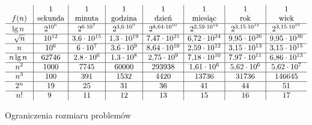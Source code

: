 \begin{table}[h]
	\begin{scriptsize}
		\[
			\begin{array}{c|c|c|c|c|c|c|c}
				&1&1&1&1&1&1&1 \\
				f(n) & \hbox{sekunda} & \hbox{minuta} & \hbox{godzina} & \hbox{dzień} & \hbox{miesiąc} & \hbox{rok} & \hbox{wiek} \\
				\hline
				\lg n~& 2^{10^6} & 2^{6\cdot 10^7} & 2^{3{,}6\cdot 10^9} & 2^{8{,}64\cdot 10^{10}} & 2^{2{,}59\cdot 10^{12}} & 2^{3{,}15\cdot 10^{13}} & 2^{3{,}15\cdot 10^{15}} \\
				\hline
				\sqrt{n} & 10^{12} & 3{,}6\cdot 10^{15} & 1{,}3\cdot 10^{19} & 7{,}47\cdot 10^{21} & 6{,}72\cdot 10^{24} & 9{,}95\cdot 10^{26} & 9{,}95\cdot 10^{30} \\
				\hline
				n & 10^6 & 6\cdot 10^7 & 3{,}6\cdot 10^9 & 8{,}64\cdot 10^{10} & 2{,}59\cdot 10^{12} & 3{,}15\cdot 10^{13} & 3{,}15\cdot 10^{15} \\
				\hline
				n\lg n~& 62746 & 2{,}8\cdot 10^6 & 1{,}3\cdot 10^8 & 2{,}75\cdot 10^9 & 7{,}18\cdot 10^{10} & 7{,}97\cdot 10^{11} & 6{,}86\cdot 10^{13} \\
				\hline
				n^2 & 1000 & 7745 & 60000 & 293938 & 1{,}61\cdot 10^6 & 5{,}62\cdot 10^6 & 5{,}62\cdot 10^7 \\
				\hline
				n^3 & 100 & 391 & 1532 & 4420 & 13736 & 31736 & 146645 \\
				\hline
				2^n & 19 & 25 & 31 & 36 & 41 & 44 & 51 \\
				\hline
				n! & 9~& 11 & 12 & 13 & 15 & 16 & 17
			\end{array}
		\]
	\end{scriptsize}
	\caption{Ograniczenia rozmiaru problemów}
\end{table}

